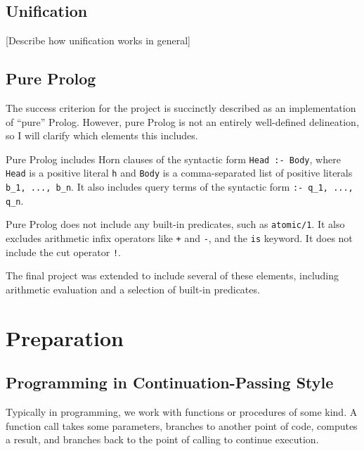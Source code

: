 \documentclass[12pt]{article}
\begin{document}
\subsection{Unification}

[Describe how unification works in general]

\subsection{Pure Prolog}

The success criterion for the project is succinctly described as an implementation of ``pure'' Prolog. 
However, pure Prolog is not an entirely well-defined delineation, so I will clarify which elements this includes.

Pure Prolog includes Horn clauses of the syntactic form \verb|Head :- Body|, where \verb|Head| is a positive literal \verb|h| and \verb|Body| is a comma-separated list of positive literals \verb|b_1, ..., b_n|. 
It also includes query terms of the syntactic form \verb|:- q_1, ..., q_n|.

Pure Prolog does not include any built-in predicates, such as \verb|atomic/1|. 
It also excludes arithmetic infix operators like \verb|+| and \verb|-|, and the \verb|is| keyword. 
It does not include the cut operator \verb|!|.

The final project was extended to include several of these elements, including arithmetic evaluation and a selection of built-in predicates.

\newpage

\section{Preparation}



\subsection{Programming in Continuation-Passing Style}

Typically in programming, we work with functions or procedures of some kind. 
A function call takes some parameters, branches to another point of code, computes a result, and branches back to the point of calling to continue execution.
\end{document}
